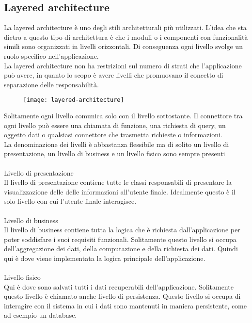 \subsection{Layered architecture}
La layered architecture è uno degli stili architetturali più utilizzati. L'idea che sta dietro a
questo tipo di architettura è che i moduli o i componenti con funzionalità simili sono organizzati
in livelli orizzontali. Di conseguenza ogni livello svolge un ruolo specifico nell'applicazione.
\\
La layered architecture non ha restrizioni sul numero di strati che l'applicazione può avere, in quanto 
lo scopo è avere livelli che promuovano il concetto di separazione delle responsabilità.
\begin{figure}[!h]
    \centering
    \texttt{[image: layered-architecture]}
\end{figure}
\leavevmode\newline
Solitamente ogni livello comunica solo con il livello sottostante. Il connettore tra ogni livello può 
essere una chiamata di funzione, una richiesta di query, un oggetto dati o qualsiasi connettore che
trasmetta richieste o informazioni.
\\
La denominazione dei livelli è abbastanza flessibile ma di solito un livello di presentazione, un livello
di business e un livello fisico sono sempre presenti
\\\\
Livello di presentazione
\\
Il livello di presentazione contiene tutte le classi responsabili di presentare la visualizzazione delle
delle informazioni all'utente finale. Idealmente questo è il solo livello con cui l'utente finale 
interagisce.
\\\\
Livello di business
\\
Il livello di business contiene tutta la logica che è richiesta dall'applicazione per poter soddisfare i 
suoi requisiti funzionali. Solitamente questo livello si occupa dell'aggregazione dei dati, della computazione
e della richiesta dei dati. Quindi qui è dove viene implementata la logica principale dell'applicazione.
\\\\
Livello fisico
\\
Qui è dove sono salvati tutti i dati recuperabili dell'applicazione. Solitamente questo livello è chiamato
anche livello di persistenza. Questo livello si occupa di interagire con il sistema in cui i dati 
sono mantenuti in maniera persistente, come ad esempio un database.
\leavevmode\newline
